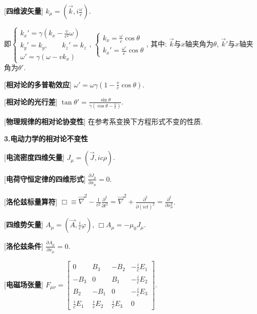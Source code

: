 [\textbf{四维波矢量}] $k_\mu=(\vec k,i\frac{\omega}{c})$.\par
\qquad 即$\begin{cases}k_x'=\gamma(k_x-\frac{v}{c^2}\omega)\\k_y'=k_y,\qquad k_z'=k_z\\\omega'=\gamma(\omega-vk_x)\end{cases}$, $\begin{cases}k_x=\frac{\omega}{c}\cos\theta\\k_x'=\frac{\omega'}{c}\cos\theta \end{cases}$, 其中: $\vec k$与$x$轴夹角为$\theta$, $\vec k'$与$x$轴夹角为$\theta'$.\par

[\textbf{相对论的多普勒效应}] $\omega'=\omega\gamma(1-\frac{v}{c}\cos\theta)$.\par

[\textbf{相对论的光行差}] $\tan\theta'=\frac{\sin\theta}{\gamma(\cos\theta-\frac{v}{c})}$.\par

[\textbf{物理规律的相对论协变性}] 在参考系变换下方程形式不变的性质.\par

\begin{center}
 \textbf{3.电动力学的相对论不变性}
\end{center}

[\textbf{电流密度四维矢量}] $J_\mu=(\vec J,ic\rho)$.\par

[\textbf{电荷守恒定律的四维形式}] $\frac{\partial J_\mu}{\partial x_\mu}=0$.\par

[\textbf{洛伦兹标量算符}] $\Box\equiv \vec\nabla^2-\frac{1}{c^2}\frac{\partial^2}{\partial t^2}=\vec\nabla^2+\frac{\partial^2}{\partial(ict)^2}=\frac{\partial^2}{\partial x_\mu^2}$.\par

[\textbf{四维势矢量}] $A_\mu=(\vec A,\frac{i}{c}\varphi)$, $\Box A_\mu=-\mu_0J_\mu$.\par

[\textbf{洛伦兹条件}] $\frac{\partial A_\mu}{\partial x_\mu}=0$.\par

[\textbf{电磁场张量}] $F_{\mu\nu}=\left[\begin{matrix}0&B_3&-B_2&-\frac{i}{c}E_1\\-B_3&0&B_1&-\frac{i}{c}E_2\\B_2&-B_1&0&-\frac{i}{c}E_3\\\frac{i}{c}E_1&\frac{i}{c}E_2&\frac{i}{c}E_3&0\end{matrix}\right]$.\par

